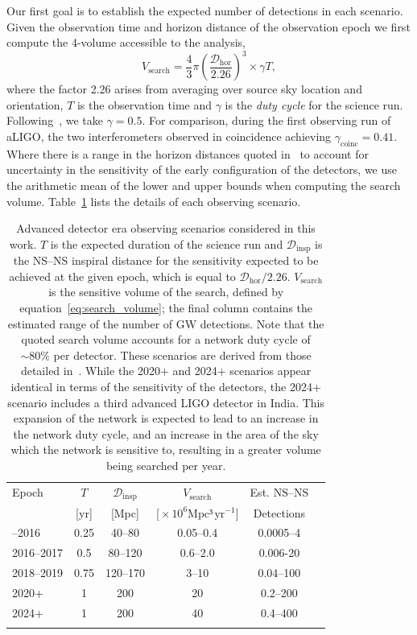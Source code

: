 \documentclass[twocolumn]{aastex61}
\newcommand{\ee}[1]{\ensuremath{\!\times\!10^{#1}}}
\newcommand{\dhor}{\ensuremath{{\mathcal D}_{\mathrm{hor}}}}
\newcommand{\dinsp}{\ensuremath{{\mathcal D}_{\mathrm{insp}}}}
\newcommand{\mpc}{\mathrm{Mpc}}
\newcommand{\yr}{\mathrm{yr}}
\newcommand{\BNS}{\ac{NS}--\ac{NS}\xspace}
\begin{document}
Our first goal is to establish the expected number of detections in
each scenario.  Given the observation time and horizon distance of the
observation epoch we first compute the 4-volume accessible to the
analysis,
%
\begin{equation}
    \label{eq:search_volume}
    V_{\mathrm{search}} = \frac{4}{3}\pi \left(\frac{\dhor}{2.26}\right)^3 \times \gamma T,
\end{equation}
%
where the factor 2.26 arises from averaging over source sky location
and orientation, $T$ is the observation time and $\gamma$ is the
\emph{duty cycle} for the science run.  Following~\cite{Aasi:2013wya},
we take $\gamma=0.5$.  For comparison, during the first observing run
of \ac{aLIGO}, the two interferometers observed in coincidence
achieving $\gamma_{\mathrm{coinc}} = 0.41$.  Where there is a range in
the horizon distances quoted in~\cite{Aasi:2013wya} to account for
uncertainty in the sensitivity of the early configuration of the
detectors, we use the arithmetic mean of the lower and upper bounds
when computing the search volume.  Table~\ref{tab:scenarios} lists
the details of each observing scenario.
%
\begin{table}
\centering
\begin{tabular}{lccccc}
  \toprule
  Epoch &  $T$ & \dinsp & $V_{\mathrm{search}}$ & Est. \BNS \\
        &   [yr] & [Mpc] & [$\ee{6} \mpc³\,\yr^{-1}$] & Detections \\
  \colrule
  2015--2016 & 0.25 & 40--80   & 0.05--0.4 & 0.0005--4 \\
  2016--2017 & 0.5 & 80--120 & 0.6--2.0 & 0.006-20\\
  2018--2019 & 0.75 & 120--170 & 3--10 & 0.04--100\\
  2020+      & 1    & 200 & 20 & 0.2--200 \\
  2024+      & 1    & 200 & 40 & 0.4--400 \\
  \botrule
\end{tabular}
\caption{Advanced detector era observing scenarios considered in this
  work.  $T$ is the expected duration of the science run and $\dinsp$
  is the \BNS inspiral distance for the sensitivity expected to be
  achieved at the given epoch, which is equal to $\dhor / 2.26$.
  $V_{\mathrm{search}}$ is the sensitive volume of the search, defined
  by equation~\ref{eq:search_volume}; the final column contains the
  estimated range of the number of \ac{GW} detections.  Note that the
  quoted search volume accounts for a network duty cycle of
  $\sim 80\%$ per detector.  These scenarios are derived from those detailed
  in~\cite{Aasi:2013wya}. While the 2020+ and 2024+ scenarios appear
  identical in terms of the sensitivity of the detectors, the 2024+
  scenario includes a third advanced LIGO detector in India. This
  expansion of the network is expected to lead to an increase in the
  network duty cycle, and an increase in the area of the sky which the network is sensitive to, resulting in a greater volume being searched per
  year.
  \label{tab:scenarios}}
\end{table}
%
\end{document}
